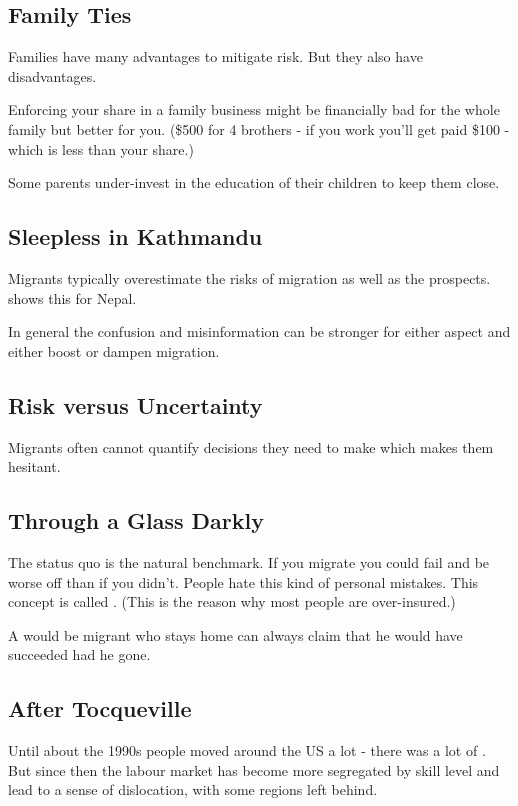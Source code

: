 \documentclass[a4paper, twocolumn]{article}
\newcommand{\keyword}[1]{\textbf{\color{black}{#1}}}
\begin{document}
\subsection{Family Ties}
Families have many advantages to mitigate risk. But they also have disadvantages.

Enforcing your share in a family business might be financially bad for the whole family but better for you. (\$500 for 4 brothers - if you work you'll get paid \$100 - which is less than your share.)

Some parents under-invest in the education of their children to keep them close.

\subsection{Sleepless in Kathmandu}
Migrants typically overestimate the risks of migration as well as the prospects. \cite{nepal-misinfo} shows this for Nepal.

In general the confusion and misinformation can be stronger for either aspect and either boost or dampen migration.

\subsection{Risk versus Uncertainty}
Migrants often cannot quantify decisions they need to make which makes them hesitant.

\subsection{Through a Glass Darkly}
The status quo is the natural benchmark. If you migrate you could fail and be worse off than if you didn't. People hate this kind of personal mistakes. This concept is called \keyword{loss aversion}. (This is the reason why most people are over-insured.)

A would be migrant who stays home can always claim that he would have succeeded had he gone.

\subsection{After Tocqueville}
Until about the 1990s people moved around the US a lot - there was a lot of \keyword{restlessness}. But since then the labour market has become more segregated by skill level and lead to a sense of dislocation, with some regions left behind.
\end{document}

